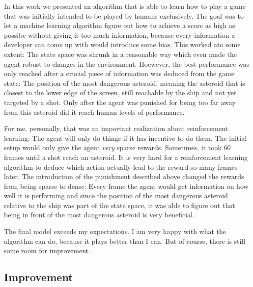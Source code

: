 \documentclass[a4paper,10pt]{article}
\begin{document}
In this work we presented an algorithm that is able to learn how to play a game that was initially intended to be played by humans exclusively.
The goal was to let a machine learning algorithm figure out how to achieve a score as high as possibe without giving it too much information, because every information a developer can come up with would introduce some bias.
This worked ato some extent: The state space was shrunk in a reasonable way which even made the agent robust to changes in the environment.
Hoewever, the best performance was only reached after a crucial piece of information was deduced from the game state: The position of the most dangerous asteroid, meaning the asteroid that is closest to the lower edge of the screen, still reachable by the ship and not yet targeted by a shot.
Only after the agent was punished for being too far away from this asteroid did it reach human levels of performance.

For me, personally, that was an important realization about reinforcement learning: The agent will only do things if it has incentive to do them.
The initial setup would only give the agent \emph{very} sparse rewards. Sometimes, it took $60$ frames until a shot reach an asteroid. 
It is very hard for a reinforcement learning algorithm to deduce which action actually lead to the reward so many frames later.
The introduction of the punishment described above changed the rewards from being sparse to dense: Every frame the agent would get information on how well it is performing and since the position of the most dangerous asteroid relative to the ship was part of the state space, it was able to figure out that being in front of the most dangerous asteroid is very beneficial.

The final model exceeds my expectations. I am very happy with what the algorithm can do, because it plays better than I can.
But of course, there is still some room for improvement.
\subsection{Improvement}
\end{document}
